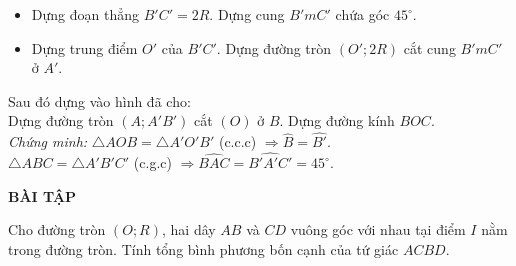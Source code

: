 \begin{vd}
{		\begin{itemize}
			\item Dựng đoạn thẳng $B'C'=2R.$ Dựng cung $B'mC'$ chứa góc $45^{\circ}.$
			\item Dựng trung điểm $O'$ của $B'C'$. Dựng đường tròn $(O';2R)$ cắt cung $B'mC'$ ở $A'$.
		\end{itemize}
		Sau đó dựng vào hình đã cho:\\
		Dựng đường tròn $(A;A'B')$ cắt $(O)$ ở $B$. Dựng đường kính $BOC$.\\
		\textit{Chứng minh:} $\triangle AOB = \triangle A'O'B'$ (c.c.c) $\Rightarrow \widehat{B}=\widehat{B'}.$\\
		$\triangle ABC = \triangle A'B'C'$ (c.g.c) $\Rightarrow \widehat{BAC}=\widehat{B'A'C'}=45^{\circ}.$	
	}
\end{vd}
\begin{center}
 \large \textbf{BÀI TẬP}
\end{center}
\setcounter{bt}{119}
\begin{bt}%
   Cho đường tròn $(O;R)$, hai dây $AB$ và $CD$ vuông góc với nhau tại điểm $I$ nằm trong đường tròn. Tính tổng bình phương bốn cạnh của tứ giác $ACBD$.
\end{bt}
